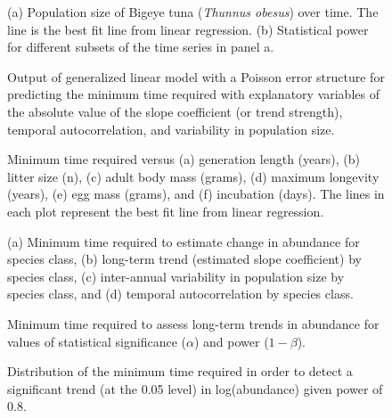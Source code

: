 \documentclass[12pt,]{article}
\begin{document}
\setcounter{figure}{0} \renewcommand{\thefigure}{A\arabic{figure}}

\begin{figure}[htbp]
\centering
\caption{(a) Population size of Bigeye tuna (\emph{Thunnus obesus}) over
time. The line is the best fit line from linear regression. (b)
Statistical power for different subsets of the time series in panel
a.\label{fig:empirical_approach_example}}
\end{figure}

\begin{figure}[htbp]
\centering
\caption{Output of generalized linear model with a Poisson error
structure for predicting the minimum time required with explanatory
variables of the absolute value of the slope coefficient (or trend
strength), temporal autocorrelation, and variability in population
size.\label{fig:poisson_model}}
\end{figure}

\begin{figure}[htbp]
\centering
\caption{Minimum time required versus (a) generation length (years), (b)
litter size (n), (c) adult body mass (grams), (d) maximum longevity
(years), (e) egg mass (grams), and (f) incubation (days). The lines in
each plot represent the best fit line from linear
regression.\label{fig:biological_correlates}}
\end{figure}

\begin{figure}[htbp]
\centering
\caption{(a) Minimum time required to estimate change in abundance for
species class, (b) long-term trend (estimated slope coefficient) by
species class, (c) inter-annual variability in population size by species
class, and (d) temporal autocorrelation by species
class.\label{fig:class}}
\end{figure}

\begin{figure}[htbp]
\centering
\caption{Minimum time required to assess long-term trends in abundance
for values of statistical significance (\(\alpha\)) and power
(\(1-\beta\)).\label{fig:min_time_vs_alpha_beta}}
\end{figure}

\begin{figure}[htbp]
\centering
\caption{Distribution of the minimum time required in order to detect a
significant trend (at the 0.05 level) in log(abundance) given power of
0.8.\label{fig:min_time_dist_log_pop}}
\end{figure}
\end{document}
